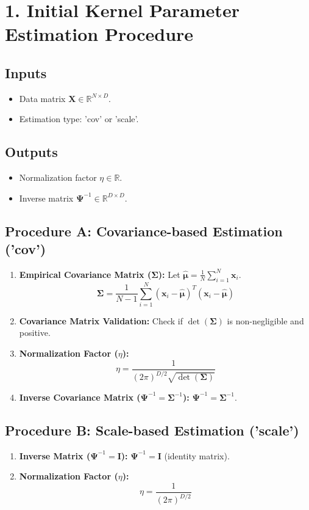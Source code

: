 \documentclass{article}
\newcommand{\mat}[1]{\mathbf{#1}} %
\newcommand{\vecbf}[1]{\bm{#1}} %
\begin{document}
\section*{1. Initial Kernel Parameter Estimation Procedure}
\subsection*{Inputs}
\begin{itemize}
    \item Data matrix $\mat{X} \in \mathbb{R}^{N \times D}$.
    \item Estimation type: 'cov' or 'scale'.
\end{itemize}
\subsection*{Outputs}
\begin{itemize}
    \item Normalization factor $\eta \in \mathbb{R}$.
    \item Inverse matrix $\mat{\Psi}^{-1} \in \mathbb{R}^{D \times D}$.
\end{itemize}

\subsection*{Procedure A: Covariance-based Estimation ('cov')}
\begin{enumerate}
    \item \textbf{Empirical Covariance Matrix ($\mat{\Sigma}$):}
    Let $\hat{\vecbf{\mu}} = \frac{1}{N} \sum_{i=1}^{N} \vecbf{x}_i$.
    $$ \mat{\Sigma} = \frac{1}{N-1} \sum_{i=1}^{N} (\vecbf{x}_i - \hat{\vecbf{\mu}})^T (\vecbf{x}_i - \hat{\vecbf{\mu}}) $$
    \item \textbf{Covariance Matrix Validation:} Check if $\det(\mat{\Sigma})$ is non-negligible and positive.
    \item \textbf{Normalization Factor ($\eta$):}
    $$ \eta = \frac{1}{(2\pi)^{D/2} \sqrt{\det(\mat{\Sigma})}} $$
    \item \textbf{Inverse Covariance Matrix ($\mat{\Psi}^{-1} = \mat{\Sigma}^{-1}$):} $\mat{\Psi}^{-1} = \mat{\Sigma}^{-1}$.
\end{enumerate}

\subsection*{Procedure B: Scale-based Estimation ('scale')}
\begin{enumerate}
    \item \textbf{Inverse Matrix ($\mat{\Psi}^{-1} = \mat{I}$):} $\mat{\Psi}^{-1} = \mat{I}$ (identity matrix).
    \item \textbf{Normalization Factor ($\eta$):}
    $$ \eta = \frac{1}{(2\pi)^{D/2}} $$
\end{enumerate}
\end{document}
